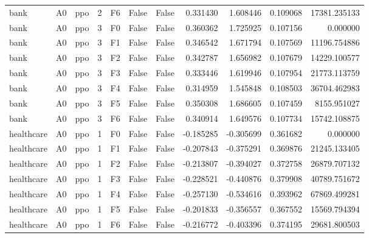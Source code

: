 \begin{tabular}{lllrlllrrrr}
      bank &      A0 &       ppo &     2 &  F6 &           False &            False &  0.331430 &  1.608446 & 0.109068 &     17381.235133 \\
      bank &      A0 &       ppo &     3 &  F0 &           False &            False &  0.360362 &  1.725925 & 0.107156 &         0.000000 \\
      bank &      A0 &       ppo &     3 &  F1 &           False &            False &  0.346542 &  1.671794 & 0.107569 &     11196.754886 \\
      bank &      A0 &       ppo &     3 &  F2 &           False &            False &  0.342787 &  1.656982 & 0.107679 &     14229.100577 \\
      bank &      A0 &       ppo &     3 &  F3 &           False &            False &  0.333446 &  1.619946 & 0.107954 &     21773.113759 \\
      bank &      A0 &       ppo &     3 &  F4 &           False &            False &  0.314959 &  1.545848 & 0.108503 &     36704.462983 \\
      bank &      A0 &       ppo &     3 &  F5 &           False &            False &  0.350308 &  1.686605 & 0.107459 &      8155.951027 \\
      bank &      A0 &       ppo &     3 &  F6 &           False &            False &  0.340914 &  1.649576 & 0.107734 &     15742.108875 \\
healthcare &      A0 &       ppo &     1 &  F0 &           False &            False & -0.185285 & -0.305699 & 0.361682 &         0.000000 \\
healthcare &      A0 &       ppo &     1 &  F1 &           False &            False & -0.207843 & -0.375291 & 0.369876 &     21245.133405 \\
healthcare &      A0 &       ppo &     1 &  F2 &           False &            False & -0.213807 & -0.394027 & 0.372758 &     26879.707132 \\
healthcare &      A0 &       ppo &     1 &  F3 &           False &            False & -0.228521 & -0.440876 & 0.379908 &     40789.751672 \\
healthcare &      A0 &       ppo &     1 &  F4 &           False &            False & -0.257130 & -0.534616 & 0.393962 &     67869.499281 \\
healthcare &      A0 &       ppo &     1 &  F5 &           False &            False & -0.201833 & -0.356557 & 0.367552 &     15569.794394 \\
healthcare &      A0 &       ppo &     1 &  F6 &           False &            False & -0.216772 & -0.403396 & 0.374195 &     29681.800503 \\

\end{tabular}
